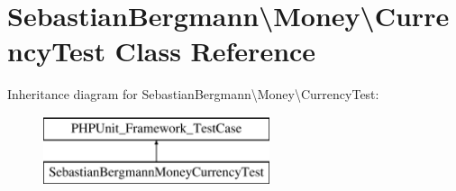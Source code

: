 \hypertarget{classSebastianBergmann_1_1Money_1_1CurrencyTest}{}\section{Sebastian\+Bergmann\textbackslash{}Money\textbackslash{}Currency\+Test Class Reference}
\label{classSebastianBergmann_1_1Money_1_1CurrencyTest}
Inheritance diagram for Sebastian\+Bergmann\textbackslash{}Money\textbackslash{}Currency\+Test\+:\begin{figure}[H]
\begin{center}
\leavevmode
\includegraphics[height=2.000000cm]{classSebastianBergmann_1_1Money_1_1CurrencyTest}
\end{center}
\end{figure}
